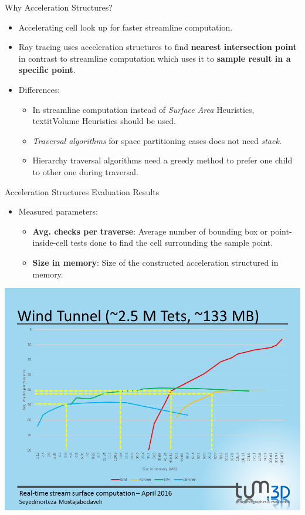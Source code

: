 \documentclass{beamer}
\begin{document}
\begin{frame}{Why Acceleration Structures?}
	\begin{itemize}
		\item Accelerating cell look up for faster streamline computation.
		\item Ray tracing uses acceleration structures to find \textbf{nearest intersection point} in contrast to streamline computation which uses it to \textbf{sample result in a specific point}.
		\item Differences:
		    \begin{itemize}
		    	\item In streamline computation instead of \textit{Surface Area} Heuristics, textit{Volume} Heuristics should be used.
		    	\item \textit{Traversal algorithms} for space partitioning cases does not need \textit{stack}.
		    	\item Hierarchy traversal algorithms need a greedy method to prefer one child to other one during traversal.
		    \end{itemize}
		
	\end{itemize}
\end{frame}

\begin{frame}{Acceleration Structures Evaluation Results}
	\begin{itemize}
		\item Measured parameters:
			 \begin{itemize}
			 	\item \textbf{Avg. checks per traverse}: Average number of bounding box or point-inside-cell tests done to find the cell surrounding the sample point.
			 	\item \textbf{Size in memory}: Size of the constructed acceleration structured in memory.
			 \end{itemize}
	\end{itemize}
\end{frame}

\begin{frame}{}
	\centering
	\includegraphics[height=\textheight]{figures/Slide23}
\end{frame}
\end{document}
